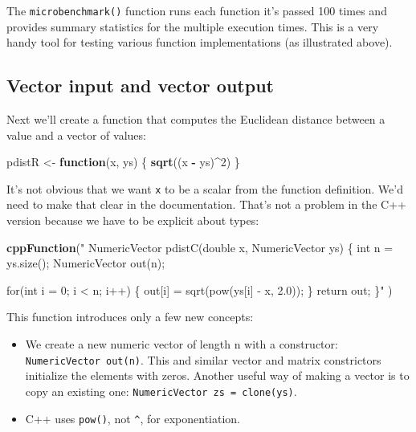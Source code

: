 \documentclass[
]{krantz}
\newenvironment{Shaded}{\begin{snugshade}}{\end{snugshade}}
\newcommand{\ControlFlowTok}[1]{\textcolor[rgb]{0.13,0.29,0.53}{\textbf{#1}}}
\newcommand{\DecValTok}[1]{\textcolor[rgb]{0.00,0.00,0.81}{#1}}
\newcommand{\KeywordTok}[1]{\textcolor[rgb]{0.13,0.29,0.53}{\textbf{#1}}}
\newcommand{\NormalTok}[1]{#1}
\newcommand{\OperatorTok}[1]{\textcolor[rgb]{0.81,0.36,0.00}{\textbf{#1}}}
\newcommand{\StringTok}[1]{\textcolor[rgb]{0.31,0.60,0.02}{#1}}
\providecommand{\tightlist}{%
  \setlength{\itemsep}{0pt}\setlength{\parskip}{0pt}}
\begin{document}
The \texttt{microbenchmark()} function runs each function it's passed 100 times and provides summary statistics for the multiple execution times. This is a very handy tool for testing various function implementations (as illustrated above).

\hypertarget{vector-input-and-vector-output}{%
\subsection{Vector input and vector output}\label{vector-input-and-vector-output}}

Next we'll create a function that computes the Euclidean distance between a value and a vector of values:

\begin{Shaded}
\begin{Highlighting}[]
\NormalTok{pdistR \textless{}{-}}\StringTok{ }\ControlFlowTok{function}\NormalTok{(x, ys) \{}
    \KeywordTok{sqrt}\NormalTok{((x }\OperatorTok{{-}}\StringTok{ }\NormalTok{ys)}\OperatorTok{\^{}}\DecValTok{2}\NormalTok{)}
\NormalTok{\}}
\end{Highlighting}
\end{Shaded}

It's not obvious that we want \texttt{x} to be a scalar from the function definition. We'd need to make that clear in the documentation. That's not a problem in the C++ version because we have to be explicit about types:

\begin{Shaded}
\begin{Highlighting}[]
\KeywordTok{cppFunction}\NormalTok{(}\StringTok{"}
\StringTok{  NumericVector pdistC(double x, NumericVector ys) \{}
\StringTok{    int n = ys.size();}
\StringTok{    NumericVector out(n);}

\StringTok{    for(int i = 0; i \textless{} n; i++) \{}
\StringTok{      out[i] = sqrt(pow(ys[i] {-} x, 2.0));}
\StringTok{    \}}
\StringTok{    return out;}
\StringTok{  \}"}
\NormalTok{)}
\end{Highlighting}
\end{Shaded}

This function introduces only a few new concepts:

\begin{itemize}
\tightlist
\item
  We create a new numeric vector of length n with a constructor: \texttt{NumericVector\ out(n)}. This and similar vector and matrix constrictors initialize the elements with zeros. Another useful way of making a vector is to copy an existing one: \texttt{NumericVector\ zs\ =\ clone(ys)}.
\item
  C++ uses \texttt{pow()}, not \texttt{\^{}}, for exponentiation.
\end{itemize}
\end{document}
